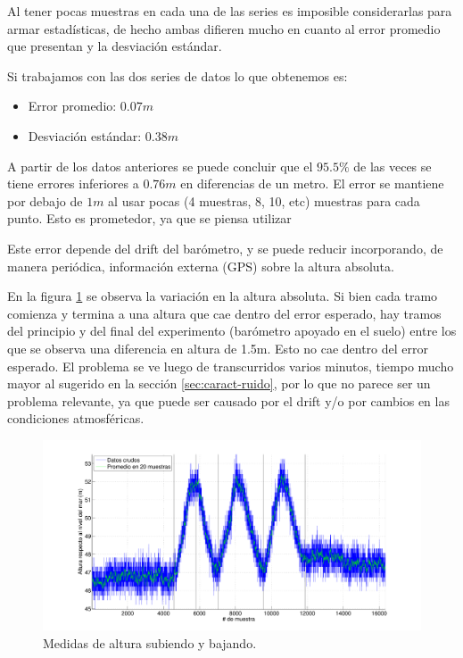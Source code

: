 \documentclass[spanish,12pt,a4paper,titlepage]{report}
\begin{document}
Al tener pocas muestras en cada una de las series es imposible considerarlas para armar estadísticas, de hecho ambas difieren mucho en cuanto al error promedio que presentan y la desviación estándar. 

Si trabajamos con las dos series de datos lo que obtenemos es:

\begin{itemize}
\item Error promedio: $0.07m$
\item Desviación estándar: $0.38m$
\end{itemize}

A partir de los datos anteriores se puede concluir que el $95.5 \%$ de las veces se tiene errores inferiores a $0.76m$ en diferencias de un metro. El error se mantiene por debajo de $1m$ al usar pocas (4 muestras, 8, 10, etc) muestras para cada punto. Esto es prometedor, ya que se piensa utilizar 

Este error depende del drift del barómetro, y se puede reducir incorporando, de manera periódica, información externa (GPS) sobre la altura absoluta.

En la figura \ref{fig:variando} se observa la variación en la altura absoluta. Si bien cada tramo comienza y termina a una altura que cae dentro del error esperado, hay tramos del principio y del final del experimento (barómetro apoyado en el suelo) entre los que se observa una diferencia en altura de 1.5m. Esto no cae dentro del error esperado. El problema se ve luego de transcurridos varios minutos, tiempo mucho mayor al sugerido en la sección \ref{sec:caract-ruido}, por lo que no parece ser un problema relevante, ya que puede ser causado por el drift y/o por cambios en las condiciones atmosféricas.

\begin{figure}[H]
\hspace{-70pt}
  \includegraphics[width=1.3\textwidth]{./pics/variando.pdf}
  \caption{Medidas de altura subiendo y bajando.}
  \label{fig:variando}
\end{figure}
\end{document}
